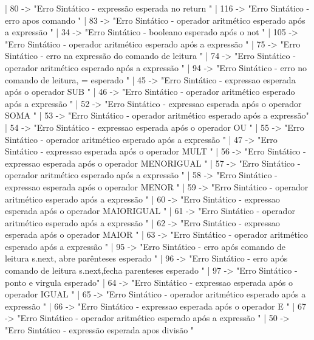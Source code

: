 \documentclass[12pt,a4paper,twoside]{report}
\begin{document}
\begin{terminal}
    | 80 ->
        "Erro Sintático - expressão esperada no return \n"
    | 116 ->
        "Erro Sintático - erro apos comando \n"
    | 83 ->
        "Erro Sintático - operador aritmético esperado após a expressão   \n"
    | 34 ->
        "Erro Sintático - booleano esperado após o not \n"
    | 105 ->
        "Erro Sintático - operador aritmético esperado após a expressão  \n"
    | 75 ->
        "Erro Sintático - erro na expressão do comando de leitura \n"
    | 74 ->
        "Erro Sintático - operador aritmético esperado após a expressão   \n"
    | 94 ->
        "Erro Sintático - erro no comando de leitura, = esperado \n"
    | 45 ->
        "Erro Sintático - expressao esperada após o operador SUB \n"
    | 46 ->
        "Erro Sintático - operador aritmético esperado após a expressão  \n"
    | 52 ->
        "Erro Sintático - expressao esperada após o operador SOMA \n"
    | 53 ->
        "Erro Sintático - operador aritmético esperado após a expressão\n"
    | 54 ->
        "Erro Sintático - expressao esperada após o operador OU \n"
    | 55 ->
        "Erro Sintático - operador aritmético esperado após a expressão \n"
    | 47 ->
        "Erro Sintático - expressao esperada após o operador MULT \n"
    | 56 ->
        "Erro Sintático - expressao esperada após o operador MENORIGUAL \n"
    | 57 ->
        "Erro Sintático - operador aritmético esperado após a expressão \n"
    | 58 ->
        "Erro Sintático - expressao esperada após o operador MENOR \n"
    | 59 ->
        "Erro Sintático - operador aritmético esperado após a expressão \n"
    | 60 ->
        "Erro Sintático - expressao esperada após o operador MAIORIGUAL \n"
    | 61 ->
        "Erro Sintático - operador aritmético esperado após a expressão \n"
    | 62 ->
        "Erro Sintático - expressao esperada após o operador MAIOR \n"
    | 63 ->
        "Erro Sintático - operador aritmético esperado após a expressão  \n"
    | 95 ->
        "Erro Sintático - erro após comando de leitura s.next, abre parênteses esperado \n"
    | 96 ->
        "Erro Sintático - erro após comando de leitura s.next,fecha parenteses esperado \n"
    | 97 ->
        "Erro Sintático - ponto e virgula esperado\n"
    | 64 ->
        "Erro Sintático - expressao esperada após o operador IGUAL \n"
    | 65 ->
        "Erro Sintático - operador aritmético esperado após a expressão \n"
    | 66 ->
        "Erro Sintático - expressao esperada após o operador E \n"
    | 67 ->
        "Erro Sintático - operador aritmético esperado após a expressão \n"
    | 50 ->
        "Erro Sintático - expressão esperada apos divisão \n"

\end{terminal}
\end{document}
